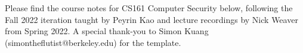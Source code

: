 \documentclass[10pt, article, oneside, margin=1in]{memoir}
\begin{document}
	\maketitle
	
	Please find the course notes for CS161 Computer Security below, following the Fall 2022 iteration taught by Peyrin Kao and lecture recordings by Nick Weaver from Spring 2022. A special thank-you to Simon Kuang (simontheflutist@berkeley.edu) for the template.
	
	\tableofcontents*
	\newpage

	
	
	
	
	
	
	
	
	
	
	
	
	
	
	
	
	
	
	
	
	
	
	
	
	
\end{document}

